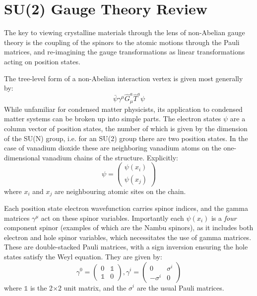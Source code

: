 \documentclass[prb,showpacs,superscriptaddress,titlepage,amsmath,amssymb,twocolumn]{revtex4-1}
\begin{document}
\section{SU(2) Gauge Theory Review}
The key to viewing crystalline materials through the lens of non-Abelian gauge theory is the coupling of the spinors to the atomic motions through the Pauli matrices, and re-imagining the gauge transformations as linear transformations acting on position states. 

The tree-level form of a non-Abelian interaction vertex is given most generally by:
\begin{equation}
\bar{\psi}\gamma^{\mu}\hat{G}_{\mu}^{a}\hat{T}^{a}\psi
\label{vertex}
\end{equation}
While unfamiliar for condensed matter physicists, its application to condensed matter systems can be broken up into simple parts. The electron states $\psi$ are a column vector of position states, the number of which is given by the dimension of the SU(N) group, i.e. for an SU(2) group there are two position states. In the case of vanadium dioxide these are neighboring vanadium atoms on the one-dimensional vanadium chains of the structure. Explicitly:
\begin{equation}
\psi = \begin{pmatrix}
\psi(x_{i})\\\psi(x_{j})
\end{pmatrix}
\end{equation}
where $x_{i}$ and $x_{j}$ are neighbouring atomic sites on the chain. 

Each position state electron wavefunction carries spinor indices, and the gamma matrices $\gamma^{\mu}$ act on these spinor variables. Importantly each $\psi(x_{i})$ is a \textit{four} component spinor (examples of which are the Nambu spinors\cite{Booth2020}), as it includes both electron and hole spinor variables, which necessitates the use of gamma matrices.  These are double-stacked Pauli matrices, with a sign inversion ensuring the hole states satisfy the Weyl equation. They are given by:
\begin{equation}
\gamma^{0} = \begin{pmatrix}0&\mathbb{1}\\\mathbb{1}&0\end{pmatrix}, \gamma^{i} = \begin{pmatrix}0&\sigma^{i}\\-\sigma^{i}&0\end{pmatrix}
\end{equation}
where $\mathbb{1}$ is the 2$\times$2 unit matrix, and the $\sigma^{i}$ are the usual Pauli matrices. 
\end{document}
